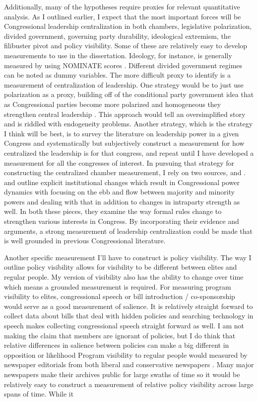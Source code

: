 \documentclass[12pt]{article}
\begin{document}
Additionally, many of the hypotheses require proxies for relevant quantitative analysis. As I outlined earlier, I expect that the most important forces will be Congressional leadership centralization in both chambers, legislative polarization, divided government, governing party durability, ideological extremism, the filibuster pivot and policy visibility. Some of these are relatively easy to develop measurements to use in the dissertation. Ideology, for instance, is generally measured by using NOMINATE scores \citep{poole1997}. Different divided government regimes can be noted as dummy variables. The more difficult proxy to identify is a measurement of centralization  of leadership. One strategy would be to just use polarization as a proxy, building off of the conditional party government idea that as Congressional parties become more polarized and homogeneous they strengthen central leadership \citep{rohde1991}. This approach would tell an oversimplified story and is riddled with endogeneity problems. Another strategy, which is the strategy I think will be best, is to survey the literature on leadership power in a given Congress and systematically but subjectively construct a measurement for how centralized the leadership is for that congress, and repeat until I have developed a measurement for all the congresses of interest. In pursuing that strategy for constructing the centralized chamber measurement, I rely on two sources, \citet{binder1997} and \citet{schickler2001}. \cite{binder1997} and \cite{schickler2001} outline explicit institutional changes which result in Congressional power dynamics with \citet{binder1997} focusing on the ebb and flow between majority and minority powers and \citet{schickler2001} dealing with that in addition to changes in intraparty strength as well. In both these pieces, they examine the way formal rules change to strengthen various interests in Congress. By incorporating their evidence and arguments, a strong measurement of leadership centralization could be made that is well grounded in previous Congressional literature.

Another specific measurement I'll have to construct is policy visibility. The way I outline policy visibility allows for visibility to be different between elites and regular people. My version of visibility also has the ability to change over time which means a grounded measurement is required. For measuring program visibility to elites, congressional speech or bill introduction / co-sponsorship would serve as a good measurement of salience. It is relatively straight forward to collect data about bills that deal with hidden policies and searching technology in speech makes collecting congressional speech straight forward as well. I am not making the claim that members are ignorant of policies, but I do think that relative differences in salience between policies can make a big different in opposition or likelihood Program visibility to regular people would measured by newspaper editorials from both liberal and conservative newspapers \citep{segal2002, gentzkow2010}. Many major newspapers make their archives public for large swaths of time so it would be relatively easy to construct a measurement of relative policy visibility across large spans of time. While it 
\end{document}
